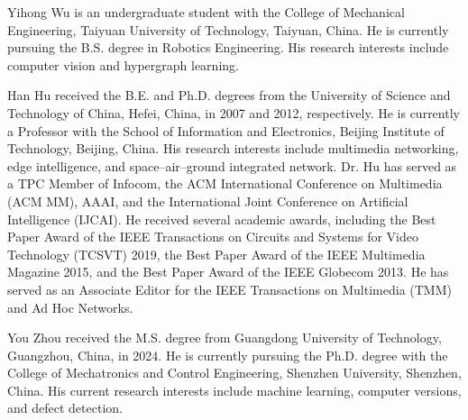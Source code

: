 \documentclass[lettersize,journal]{IEEEtran}
\begin{document}
\begin{IEEEbiography}{Yihong Wu} 
is an undergraduate student with the College of Mechanical Engineering, Taiyuan University of Technology, Taiyuan, China. He is currently pursuing the B.S. degree in Robotics Engineering. His research interests include computer vision and hypergraph learning.
\end{IEEEbiography}

\begin{IEEEbiography}{Han Hu} received the B.E. and Ph.D. degrees from the University of Science and Technology of China, Hefei, China, in 2007 and 2012, respectively. He is currently a Professor with the School of Information and Electronics, Beijing Institute of Technology, Beijing, China. His research interests include multimedia networking, edge intelligence, and space–air–ground integrated network. Dr. Hu has served as a TPC Member of Infocom, the ACM International Conference on Multimedia (ACM MM), AAAI, and the International Joint Conference on Artificial Intelligence (IJCAI). He received several academic awards, including the Best Paper Award of the IEEE Transactions on Circuits and Systems for Video Technology (TCSVT) 2019, the Best Paper Award of the IEEE Multimedia Magazine 2015, and the Best Paper Award of the IEEE Globecom 2013. He has served as an Associate Editor for the IEEE Transactions on Multimedia (TMM) and Ad Hoc Networks.
\end{IEEEbiography}

\begin{IEEEbiography}{You Zhou} received the M.S. degree from Guangdong University of Technology, Guangzhou, China, in 2024. He is currently pursuing the Ph.D. degree with the College of Mechatronics and Control Engineering, Shenzhen University, Shenzhen, China. His current research interests include machine learning, computer versions, and defect detection.
\end{IEEEbiography}
\end{document}

